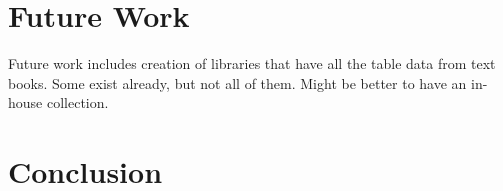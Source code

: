 \section{Future Work}



Future work includes creation of libraries that have all the table 
data from text books. Some exist already, but not all of them. Might 
be better to have an in-house collection.

\section{Conclusion}
